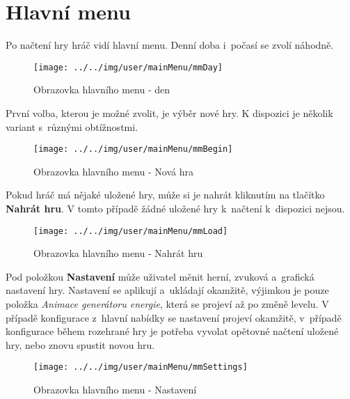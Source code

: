 
\section{Hlavní menu}

Po načtení hry hráč vidí hlavní menu. Denní doba i~počasí se zvolí náhodně.

\begin{figure}[!ht]\centering
\texttt{[image: ../../img/user/mainMenu/mmDay]}

\caption{Obrazovka hlavního menu - den}
\label{fig:user_mainMenu_mmDay}

\end{figure}


\FloatBarrier

První volba, kterou je možné zvolit, je výběr nové hry. K dispozici je několik variant s~různými obtížnostmi.

\begin{figure}[!ht]\centering
\texttt{[image: ../../img/user/mainMenu/mmBegin]}

\caption{Obrazovka hlavního menu - Nová hra}
\label{fig:user_mainMenu_mmBegin}

\end{figure}
\FloatBarrier

Pokud hráč má nějaké uložené hry, může si je nahrát kliknutím na tlačítko \textbf{Nahrát hru}. V tomto případě žádné uložené hry k~načtení k~dispozici nejsou.

\begin{figure}[!ht]\centering
\texttt{[image: ../../img/user/mainMenu/mmLoad]}

\caption{Obrazovka hlavního menu - Nahrát hru}
\label{fig:user_mainMenu_mmLoad}

\end{figure}
\FloatBarrier

Pod položkou \textbf{Nastavení} může uživatel měnit herní, zvuková a~grafická nastavení hry. Nastavení se aplikují a~ukládají okamžitě, výjimkou je pouze položka \textit{Animace generátoru energie}, která se projeví až po změně levelu. V případě konfigurace z~hlavní nabídky se nastavení projeví okamžitě, v~případě konfigurace během rozehrané hry je potřeba vyvolat opětovné načtení uložené hry, nebo znovu spustit novou hru.

\begin{figure}[!ht]\centering
\texttt{[image: ../../img/user/mainMenu/mmSettings]}

\caption{Obrazovka hlavního menu - Nastavení}
\label{fig:user_mainMenu_mmSettings}

\end{figure}

\FloatBarrier
